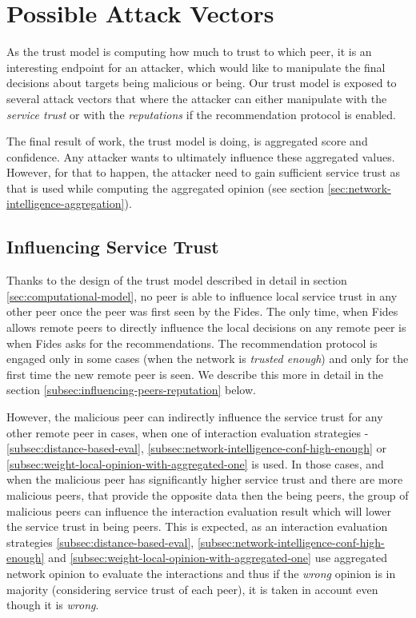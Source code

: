 \section{Possible Attack Vectors}
\label{sec:attack-vectors}
As the trust model is computing how much to trust to which peer, it is an interesting endpoint for an attacker, which would like to manipulate the final decisions about targets being malicious or being.
Our trust model is exposed to several attack vectors that where the attacker can either manipulate with the \textit{service trust} or with the \textit{reputations} if the recommendation protocol is enabled. 

The final result of work, the trust model is doing, is aggregated score and confidence.
Any attacker wants to ultimately influence these aggregated values.
However, for that to happen, the attacker need to gain sufficient service trust as that is used while computing the aggregated opinion (see section \ref{sec:network-intelligence-aggregation}).

\subsection{Influencing Service Trust}
\label{subsec:influencing-service-trust}
Thanks to the design of the trust model described in detail in section \ref{sec:computational-model}, no peer is able to influence local service trust in any other peer once the peer was first seen by the Fides.
The only time, when Fides allows remote peers to directly influence the local decisions on any remote peer is when Fides asks for the recommendations. 
The recommendation protocol is engaged only in some cases (when the network is \textit{trusted enough}) and only for the first time the new remote peer is seen. We describe this more in detail in the section \ref{subsec:influencing-peers-reputation} below.

However, the malicious peer can indirectly influence the service trust for any other remote peer in cases, when one of interaction evaluation strategies - \ref{subsec:distance-based-eval}, \ref{subsec:network-intelligence-conf-high-enough} or \ref{subsec:weight-local-opinion-with-aggregated-one} is used.
In those cases, and when the malicious peer has significantly higher service trust and there are more malicious peers, that provide the opposite data then the being peers, the group of malicious peers can influence the interaction evaluation result which will lower the service trust in being peers.
This is expected, as an interaction evaluation strategies \ref{subsec:distance-based-eval}, \ref{subsec:network-intelligence-conf-high-enough} and \ref{subsec:weight-local-opinion-with-aggregated-one} use aggregated network opinion to evaluate the interactions and thus if the \textit{wrong} opinion is in majority (considering service trust of each peer), it is taken in account even though it is \textit{wrong}.

